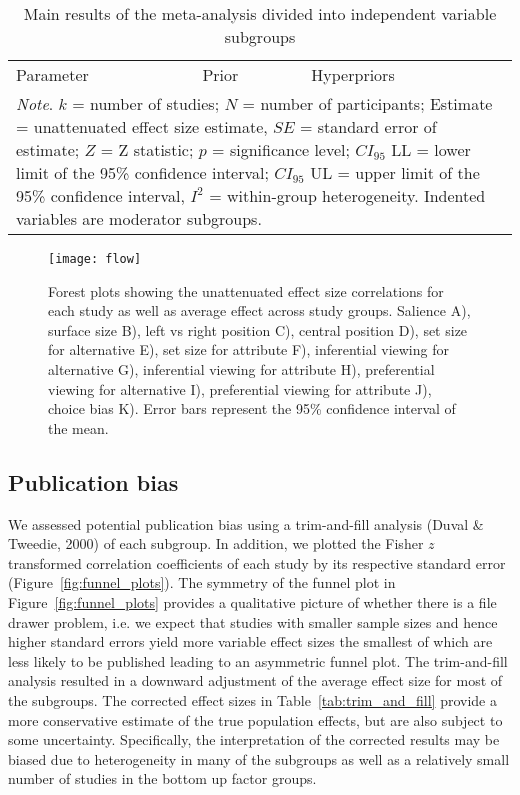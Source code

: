 \documentclass{article}
\newcommand{\SE}{\mathit{SE}}
\begin{document}
\begin{table*}
\caption{Main results of the meta-analysis divided into independent variable subgroups }
\label{tab:main_results}
\centering
\begin{tabularx}{\columnwidth}{p{}p{}p{}}
  \cmidrule(lr){1-3}
    \multicolumn{1}{l}{Parameter} &
    \multicolumn{1}{l}{Prior} &
    \multicolumn{1}{l}{Hyperpriors} \\
  \cmidrule(lr){1-3}
  
  \cmidrule(lr){1-3}

\multicolumn{3}{p{0.95\columnwidth}}{\textit{Note}. $k$ = number of studies; $N$ = number of participants; Estimate = unattenuated effect size estimate, $\SE$ = standard error of estimate; $Z$ = Z statistic; $p$ = significance level; $CI_{95}$ LL = lower limit of the 95\% confidence interval; $CI_{95}$ UL = upper limit of the 95\% confidence interval, $I^2$ = within-group heterogeneity. Indented variables are moderator subgroups.}
\end{tabularx}
\end{table*}


\begin{figure}[H]
\texttt{[image: flow]}
\centering
\caption{Forest plots showing the unattenuated effect size correlations for each study as well as average effect across study groups. Salience A), surface size B), left vs right position C), central position D), set size for alternative E), set size for attribute F), inferential viewing for alternative G), inferential viewing for attribute H), preferential viewing for alternative I), preferential viewing for attribute J), choice bias K). Error bars represent the 95\% confidence interval of the mean.}
\label{fig:forest_plots}
\end{figure}


\subsection{Publication bias}

We assessed potential publication bias using a trim-and-fill analysis (Duval \& Tweedie, 2000) of each subgroup. In addition, we plotted the Fisher $z$ transformed correlation coefficients of each study by its respective standard error (Figure~\ref{fig:funnel_plots}). The symmetry of the funnel plot in Figure~\ref{fig:funnel_plots} provides a qualitative picture of whether there is a file drawer problem, i.e. we expect that studies with smaller sample sizes and hence higher standard errors yield more variable effect sizes the smallest of which are less likely to be published leading to an asymmetric funnel plot. The trim-and-fill analysis resulted in a downward adjustment of the average effect size for most of the subgroups. The corrected effect sizes in Table~\ref{tab:trim_and_fill} provide a more conservative estimate of the true population effects, but are also subject to some uncertainty. Specifically, the interpretation of the corrected results may be biased due to heterogeneity in many of the subgroups as well as a relatively small number of studies in the bottom up factor groups.
\end{document}
